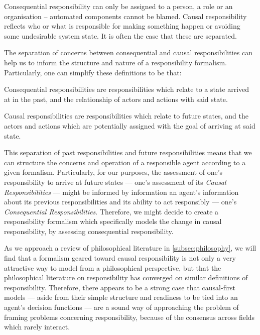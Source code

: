 \begin{displayquote}
    Consequential responsibility can only be assigned to a person, a role or an organisation – automated components cannot be blamed. Causal responsibility reflects who or what is responsible for making something happen or avoiding some undesirable system state. It is often the case that these are separated.
\end{displayquote}

The separation of concerns between consequential and causal responsibilities can help us to inform the structure and nature of a responsibility formalism. Particularly, one can simplify these definitions to be that:

\begin{displayquote}
    Consequential responsibilities are responsibilities which relate to a state arrived at in the past, and the relationship of actors and actions with said state.
\end{displayquote}\par

\begin{displayquote}
    Causal responsibilities are responsibilities which relate to future states, and the actors and actions which are potentially assigned with the goal of arriving at said state.
\end{displayquote}

This separation of past responsibilities and future responsibilities means that we can structure the concerns and operation of a responsible agent according to a given formalism. Particularly, for our purposes, the assessment of one's responsibility to arrive at future states --- one's assessment of its \emph{Causal Responsibilities} --- might be informed by information an agent's information about its previous responsibilities and its ability to act responsibly --- one's \emph{Consequential Responsibilities}. Therefore, we might decide to create a responsibility formalism which specifically models the change in causal responsibility, by assessing consequential responsibility.\par

As we approach a review of philosophical literature in \cref{subsec:philosophy}, we will find that a formalism geared toward causal responsibility is not only a very attractive way to model from a philosophical perspective, but that the philosophical literature on responsibility has converged on similar definitions of responsibility. Therefore, there appears to be a strong case that causal-first models --- aside from their simple structure and readiness to be tied into an agent's decision functions --- are a sound way of approaching the problem of framing problems concerning responsibility,  because of the consensus across fields which rarely interact.

